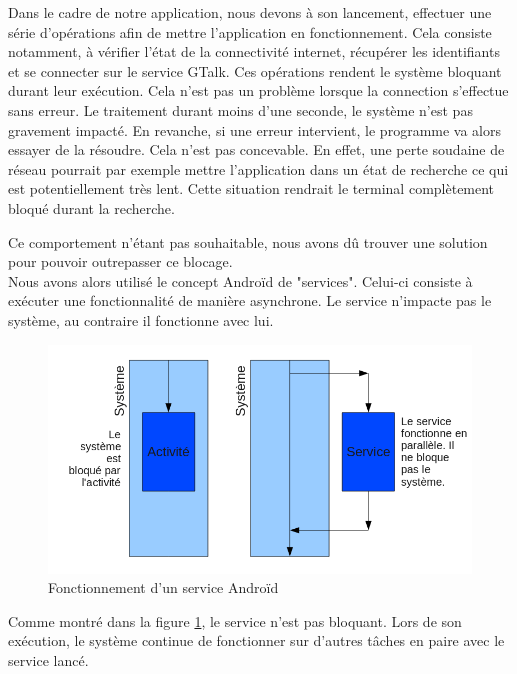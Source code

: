 Dans le cadre de notre application, nous devons à son lancement, effectuer une série d'opérations 
afin de mettre l'application en fonctionnement. Cela consiste notamment, à vérifier l'état de la 
connectivité internet, récupérer les identifiants et se connecter sur le service GTalk. Ces 
opérations rendent le système bloquant durant leur exécution. Cela n'est pas un problème lorsque la 
connection s'effectue sans erreur. Le traitement durant moins d'une seconde, le système n'est pas
gravement impacté. En revanche, si une erreur intervient, le programme va alors essayer de la résoudre.
Cela n'est pas concevable. En effet, une perte soudaine de réseau pourrait par exemple mettre 
l'application dans un état de recherche ce qui est potentiellement très lent. Cette situation rendrait
le terminal complètement bloqué durant la recherche. 

Ce comportement n'étant pas souhaitable, nous avons dû trouver une solution pour pouvoir outrepasser ce blocage.
\\


Nous avons alors utilisé le concept Androïd de "services". Celui-ci consiste à exécuter une fonctionnalité 
de manière asynchrone. Le service n'impacte pas le système, au contraire il fonctionne avec lui. 
 
\begin{figure}[!h]
  \center
  \includegraphics[width=13cm]{img/fonctionnement-des-services-android.png}
  \caption{Fonctionnement d'un service Androïd}
  \label{fonctionnement-des-services-android}
\end{figure}

Comme montré dans la figure \ref{fonctionnement-des-services-android}, le service n'est pas  bloquant. 
Lors de son exécution, le système continue de fonctionner sur d'autres tâches en paire avec le service lancé.
\\


